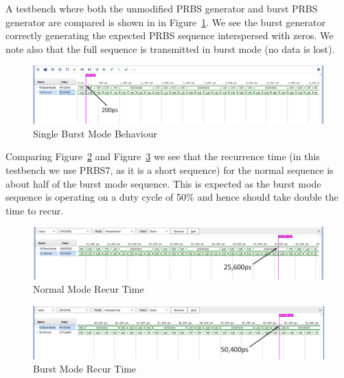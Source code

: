 A testbench where both the unmodified PRBS generator and burst PRBS generator
are compared is shown in in Figure~\ref{fig:burst_mode_start}.  We see the
burst generator correctly generating the expected PRBS sequence interspersed
with zeros. We note also that the full sequence is transmitted in burst mode (no
data is lost).

\begin{figure}[ht]
    \centering
    \hspace*{-3cm}\includegraphics[width=1.5\linewidth]{img/burst_mode_1.png}
    \caption{Single Burst Mode Behaviour}%
    \label{fig:burst_mode_start}
\end{figure}

Comparing Figure~\ref{fig:normal_mode_recur} and
Figure~\ref{fig:burst_mode_recur} we see that the recurrence time (in this
testbench we use PRBS7, as it is a short sequence) for the normal sequence is
about half of the burst mode sequence. This is expected as the burst mode
sequence is operating on a duty cycle of 50\% and hence should take double the
time to recur.

\begin{figure}[ht]
    \centering
    \hspace*{-3cm}\includegraphics[width=1.5\linewidth]{img/burst_mode_2.png}
    \caption{Normal Mode Recur Time}%
    \label{fig:normal_mode_recur}
\end{figure}

\begin{figure}[ht]
    \centering
    \hspace*{-3cm}\includegraphics[width=1.5\linewidth]{img/burst_mode_3.png}
    \caption{Burst Mode Recur Time}%
    \label{fig:burst_mode_recur}
\end{figure}

